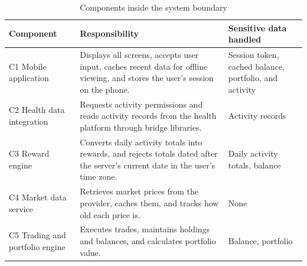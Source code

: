 \documentclass{article}
\begin{document}
\begin{table}[H]
  \caption{Components inside the system boundary} \label{TblComponents}
  \small
  \begin{tabularx}{\textwidth}{>{\raggedright\arraybackslash}p{}
    X >{\raggedright\arraybackslash}p{}}
    \toprule
    \textbf{Component}                                                           & \textbf{Responsibility}                                    & \textbf{Sensitive data
    handled}                                                                                                                                                           \\
    \midrule
    C1 Mobile application                                                        & Displays all screens, accepts user input, caches
    recent data for offline viewing, and stores the user's session on the phone. &
    Session token, cached balance, portfolio, and activity                                                                                                             \\
    C2 Health data integration                                                   & Requests activity permissions and reads activity
    records from the health platform through bridge libraries.                   & Activity
    records                                                                                                                                                            \\
    C3 Reward engine                                                             & Converts daily activity totals into rewards, and rejects totals dated after the server's current date in the user's time zone. &
    Daily activity totals, balance                                                                                                                                          \\
    C4 Market data service                                                       & Retrieves market prices from the provider, caches
    them, and tracks how old each price is.                                      & None                                                                                \\
    C5 Trading and portfolio engine                                              & Executes trades, maintains holdings and
    balances, and calculates portfolio value.                                    & Balance, portfolio                                                                  \\

\end{tabularx}
\end{table}
\end{document}
